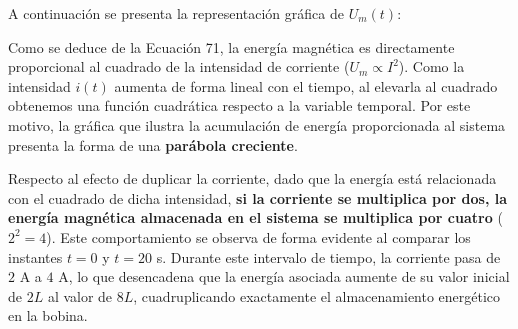 \documentclass[11pt, a4paper]{article}
\newenvironment{problem}[1][Cuestión]{
	\vspace{0.5cm}
	\noindent{\Large\bfseries #1} \par\vspace{0.5cm}
}{
	\vspace{0.5cm}
}
\begin{document}
\begin{problem}[Problema]
\begin{enumerate}[label=\alph*)]
{					A continuación se presenta la representación gráfica de $U_m(t)$:

					\begin{center}
					\end{center}

					Como se deduce de la Ecuación 71, la energía magnética es directamente proporcional al cuadrado de la intensidad de corriente ($U_m \propto I^2$). Como la intensidad $i(t)$ aumenta de forma lineal con el tiempo, al elevarla al cuadrado obtenemos una función cuadrática respecto a la variable temporal. Por este motivo, la gráfica que ilustra la acumulación de energía proporcionada al sistema presenta la forma de una \textbf{parábola creciente}.

					Respecto al efecto de duplicar la corriente, dado que la energía está relacionada con el cuadrado de dicha intensidad, \textbf{si la corriente se multiplica por dos, la energía magnética almacenada en el sistema se multiplica por cuatro} ($2^2 = 4$). Este comportamiento se observa de forma evidente al comparar los instantes $t=0$ y $t=20$ s. Durante este intervalo de tiempo, la corriente pasa de $2 \text{ A}$ a $4 \text{ A}$, lo que desencadena que la energía asociada aumente de su valor inicial de $2L$ al valor de $8L$, cuadruplicando exactamente el almacenamiento energético en la bobina.
				}
		\end{enumerate}
	\end{problem}
\end{document}
